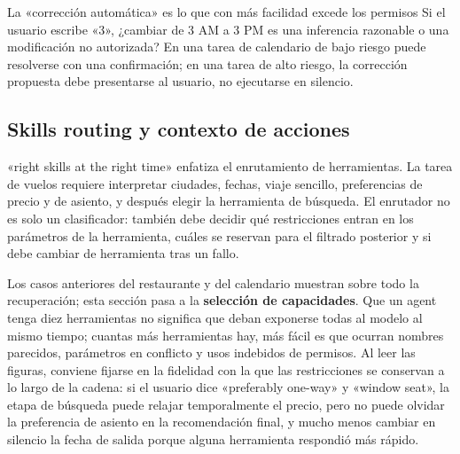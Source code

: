 



\begin{warningbox}{La «corrección automática» es lo que con más facilidad excede los permisos}
Si el usuario escribe «3», ¿cambiar de 3 AM a 3 PM es una inferencia razonable o una modificación no autorizada? En una tarea de calendario de bajo riesgo puede resolverse con una confirmación; en una tarea de alto riesgo, la corrección propuesta debe presentarse al usuario, no ejecutarse en silencio.
\end{warningbox}

\subsection{Skills routing y contexto de acciones}

«right skills at the right time» enfatiza el enrutamiento de herramientas. La tarea de vuelos requiere interpretar ciudades, fechas, viaje sencillo, preferencias de precio y de asiento, y después elegir la herramienta de búsqueda. El enrutador no es solo un clasificador: también debe decidir qué restricciones entran en los parámetros de la herramienta, cuáles se reservan para el filtrado posterior y si debe cambiar de herramienta tras un fallo.

Los casos anteriores del restaurante y del calendario muestran sobre todo la recuperación; esta sección pasa a la \textbf{selección de capacidades}. Que un agent tenga diez herramientas no significa que deban exponerse todas al modelo al mismo tiempo; cuantas más herramientas hay, más fácil es que ocurran nombres parecidos, parámetros en conflicto y usos indebidos de permisos. Al leer las figuras, conviene fijarse en la fidelidad con la que las restricciones se conservan a lo largo de la cadena: si el usuario dice «preferably one-way» y «window seat», la etapa de búsqueda puede relajar temporalmente el precio, pero no puede olvidar la preferencia de asiento en la recomendación final, y mucho menos cambiar en silencio la fecha de salida porque alguna herramienta respondió más rápido.

